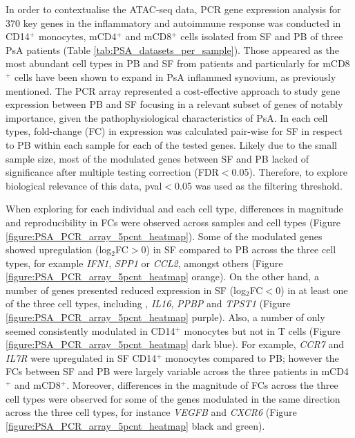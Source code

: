 In order to contextualise the ATAC-seq data, PCR gene expression analysis for 370 key genes in the inflammatory and autoimmune response was conducted in CD14$^+$ monocytes, mCD4$^+$ and mCD8$^+$ cells isolated from SF and PB of three PsA patients (Table \ref{tab:PSA_datasets_per_sample}). Those appeared as the most abundant cell types in PB and SF from patients and particularly for mCD8$^+$ cells have been shown to expand in PsA inflammed synovium, as previously mentioned. The PCR array represented a cost-effective approach to study gene expression between PB and SF focusing in a relevant subset of genes of notably importance, given the pathophysiological characteristics of PsA. In each cell types, fold-change (FC) in expression was calculated pair-wise for SF in respect to PB within each sample for each of the tested genes. Likely due to the small sample size, most of the modulated genes between SF and PB lacked of significance after multiple testing correction (FDR$<$0.05). Therefore, to explore biological relevance of this data, pval$<$0.05 was used as the filtering threshold. 

When exploring for each individual and each cell type, %
differences in magnitude and reproducibility in FCs were observed across samples and cell types (Figure \ref{figure:PSA_PCR_array_5pcnt_heatmap}). Some of the modulated genes showed upregulation (log$_2$FC$>$0) in SF compared to PB across the three cell types, for example \textit{IFN1}, \textit{SPP1} or \textit{CCL2}, amongst others (Figure \ref{figure:PSA_PCR_array_5pcnt_heatmap} orange). On the other hand, a number of genes presented reduced expression in SF (log$_2$FC$<$0) in at least one of the three cell types, including , \textit{IL16}, \textit{PPBP} and \textit{TPST1} (Figure \ref{figure:PSA_PCR_array_5pcnt_heatmap} purple). Also, a number of only seemed consistently modulated in CD14$^+$ monocytes but not in T cells (Figure \ref{figure:PSA_PCR_array_5pcnt_heatmap} dark blue). For example, \textit{CCR7} and \textit{IL7R} were upregulated in SF CD14$^+$ monocytes compared to PB; however the FCs between SF and PB were largely variable across the three patients in mCD4$^+$ and mCD8$^+$. Moreover, differences in the magnitude of FCs across the three cell types were observed for some of the genes modulated in the same direction across the three cell types, for instance \textit{VEGFB} and \textit{CXCR6} (Figure \ref{figure:PSA_PCR_array_5pcnt_heatmap} black and green).


